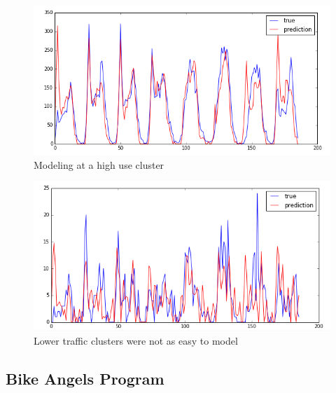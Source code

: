 \documentclass{proc}
\begin{document}
\begin{figure}[!hbt]
	\begin{center}
	\includegraphics[width=\columnwidth]{cluster_24ar.png}
	\caption{Modeling at a high use cluster}
	\end{center}
\end{figure}
\begin{figure}[!hbt]
	\begin{center}
	\includegraphics[width=\columnwidth]{cluster_11ar.png}
	\caption{Lower traffic clusters were not as easy to model}
	\end{center}
\end{figure}


\subsection{Bike Angels Program}
\end{document}
